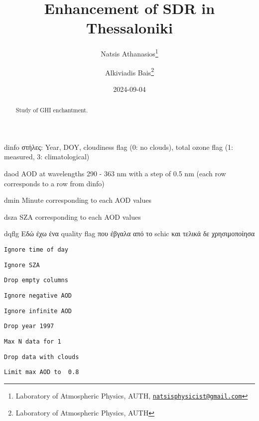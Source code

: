 \documentclass[
  10pt,
  a4paper,oneside]{article}
\title{Enhancement of SDR in Thessaloniki}
\author{Natsis Athanasios\footnote{Laboratory of Atmospheric Physics, AUTH, \href{mailto:natsisphysicist@gmail.com}{\nolinkurl{natsisphysicist@gmail.com}}} \and Alkiviadis Bais\footnote{Laboratory of Atmospheric Physics, AUTH}}
\date{2024-09-04}
\begin{document}
\maketitle
\begin{abstract}
Study of GHI enchantment.
\end{abstract}

{
\hypersetup{linkcolor=}
\setcounter{tocdepth}{4}
\tableofcontents
}
dinfo
στήλες: Year, DOY, cloudiness flag (0: no clouds), total ozone flag (1: measured, 3: climatological)

daod
AOD at wavelengths 290 - 363 nm with a step of 0.5 nm (each row corresponds to a row from dinfo)

dmin
Minute corresponding to each AOD values

dsza
SZA corresponding to each AOD values

dqflg
Εδώ έχω ένα quality flag που έβγαλα από το schic και τελικά δε χρησιμοποίησα

\begin{verbatim}
Ignore time of day
\end{verbatim}

\begin{verbatim}
Ignore SZA
\end{verbatim}

\begin{verbatim}
Drop empty columns
\end{verbatim}

\begin{verbatim}
Ignore negative AOD
\end{verbatim}

\begin{verbatim}
Ignore infinite AOD
\end{verbatim}

\begin{verbatim}
Drop year 1997
\end{verbatim}

\begin{verbatim}
Max N data for 1 
\end{verbatim}

\begin{verbatim}
Drop data with clouds
\end{verbatim}

\begin{verbatim}
Limit max AOD to  0.8 
\end{verbatim}
\end{document}
